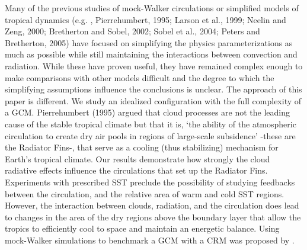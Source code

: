 \documentclass[draft]{agujournal2019}
\begin{document}
{%
Many of the previous studies of mock-Walker circulations or simplified models of tropical dynamics (e.g. , Pierrehumbert, 1995; Larson et al., 1999; Neelin and Zeng, 2000; 
Bretherton and Sobel, 2002; Sobel et al., 2004;  Peters and Bretherton, 2005)
have focused on simplifying the physics parameterizations as much as possible while still maintaining the interactions between convection and radiation.  
While these have proven useful, they have remained complex enough to make comparisons with other models 
difficult and the degree to which the simplifying assumptions influence the conclusions is unclear.    
The approach of this paper is different.  We study an idealized configuration with the full complexity of a GCM. 
Pierrehumbert (1995) argued that cloud processes are not the leading cause of the 
stable tropical climate but that it is, `the ability of
the atmospheric circulation to create dry air pools in regions of large-scale subsidence' 
-these are the Radiator Fins-, that serve as a cooling (thus stabilizing) mechanism for Earth's tropical climate.  
Our results demonstrate how strongly the cloud radiative effects influence the circulations that set up the Radiator Fins.  
Experiments with prescribed SST preclude the possibility of studying feedbacks
between the circulation, and the relative area of warm and cold SST regions.  
However, the interaction between clouds, radiation, and the circulation does lead to changes in the area of the dry 
regions above the boundary layer that allow the tropics to efficiently cool to space and maintain an energetic balance.   
Using mock-Walker simulations to benchmark a GCM with a CRM was proposed by .
}
\end{document}
